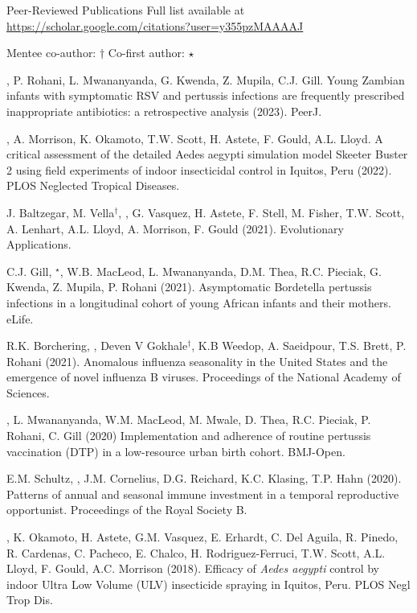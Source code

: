 \documentclass{resume} %
\begin{document}
\begin{rSection}{Peer-Reviewed Publications}
Full list available at \url{https://scholar.google.com/citations?user=y355pzMAAAAJ} 

Mentee co-author: $\dagger$ \quad Co-first author: $\star$

\authSelf, P. Rohani, L. Mwananyanda, G. Kwenda, Z. Mupila, C.J. Gill.
Young Zambian infants with symptomatic RSV and pertussis infections are frequently prescribed inappropriate antibiotics: a retrospective analysis (2023).
PeerJ.

\authSelf, A. Morrison, K. Okamoto, T.W. Scott, H. Astete, F. Gould,
A.L. Lloyd. A critical assessment of the detailed Aedes aegypti simulation model Skeeter Buster 2 using field experiments of indoor insecticidal control in Iquitos, Peru (2022).
PLOS Neglected Tropical Diseases.

J. Baltzegar, M. Vella$^\dagger$, \authSelf, G. Vasquez, H. Astete, F. Stell, M. Fisher, T.W. Scott, A. Lenhart, A.L. Lloyd, A. Morrison, F. Gould (2021). Evolutionary Applications.

C.J. Gill, \authSelf$^\star$, W.B. MacLeod, L. Mwananyanda, D.M. Thea, R.C. Pieciak, G. Kwenda, Z. Mupila, P. Rohani (2021).  Asymptomatic Bordetella pertussis infections in a longitudinal cohort of young African infants and their mothers. eLife.

R.K. Borchering, \authSelf, Deven V Gokhale$^\dagger$, K.B Weedop, A. Saeidpour, T.S. Brett, P. Rohani (2021).
Anomalous influenza seasonality in the United States and the emergence of novel influenza B viruses. Proceedings of the National Academy of Sciences.

\authSelf, L. Mwananyanda, W.M. MacLeod, M. Mwale, D. Thea, R.C.  Pieciak, P. Rohani, C. Gill (2020)
Implementation and adherence of routine pertussis vaccination (DTP) in a low-resource urban birth cohort. BMJ-Open.

E.M. Schultz, \authSelf, J.M. Cornelius, D.G. Reichard, K.C. Klasing, T.P. Hahn (2020). Patterns of annual and seasonal immune investment in a temporal reproductive opportunist. Proceedings of the Royal Society B.

\authSelf, K. Okamoto, H. Astete, G.M. Vasquez, E. Erhardt, 
C. Del Aguila, R. Pinedo, R. Cardenas, C. Pacheco, E. Chalco, 
H. Rodriguez-Ferruci, T.W. Scott, A.L. Lloyd, F. Gould, A.C. Morrison (2018).
Efficacy of {\em Aedes aegypti} control by indoor Ultra Low Volume (ULV)
insecticide spraying in Iquitos, Peru. PLOS Negl Trop Dis.


\end{rSection}
\end{document}

